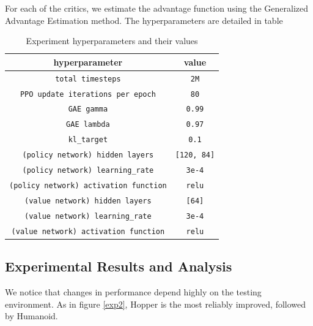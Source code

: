 For each of the critics, we estimate the advantage function using the Generalized Advantage Estimation method\cite{schulman2015highdimensional}.
The hyperparameters are detailed in table %

\begin{table}
  \begin{center}
    \begin{tabular}{cc}
      \hline 
      hyperparameter & value \\ 
      \hline 
      \verb!total timesteps! & \verb!2M! \\
      \verb!PPO update iterations per epoch! &  \verb!80! \\
      \verb!GAE gamma! & \verb!0.99! \\
      \verb!GAE lambda! & \verb!0.97! \\
      \verb!kl_target! & \verb!0.1! \\
      \verb!(policy network) hidden layers! & \verb![120, 84]! \\
      \verb!(policy network) learning_rate! & \verb!3e-4! \\
      \verb!(policy network) activation function! & \verb!relu!\\
      \verb!(value network) hidden layers! & \verb![64]! \\
      \verb!(value network) learning_rate! & \verb!3e-4! \\
      \verb!(value network) activation function! & \verb!relu! \\
      \hline      
    \end{tabular}
  \end{center}
  \caption{Experiment hyperparameters and their values}
  \label{hyperparameters}
\end{table}




 




\subsection{Experimental Results and Analysis}

We notice that changes in performance depend highly on the testing environment. 
As in figure \ref{exp2}, Hopper is the most reliably improved, followed by Humanoid.


